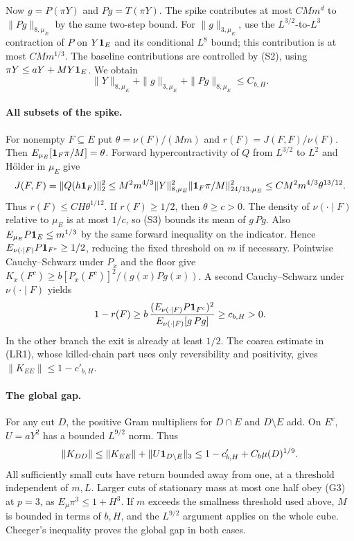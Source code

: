 Now $g=P(\pi Y)$ and $Pg=T(\pi Y)$. The spike contributes at most
$CM m^d$ to $\|Pg\|_{8,\mu_E}$ by the same two-step bound. For
$\|g\|_{3,\mu_E}$, use the $L^{3/2}$-to-$L^3$ contraction of $P$ on
$Y{\bf1}_E$ and its conditional $L^8$ bound; this contribution is
at most $CMm^{1/3}$. The baseline contributions are controlled by
(S2), using $\pi Y\le aY+MY{\bf1}_E$. We obtain
\[
 \|Y\|_{8,\mu_E}+\|g\|_{3,\mu_E}+\|Pg\|_{8,\mu_E}\le C_{b,H}.
 \tag{S3}
\]

\paragraph{All subsets of the spike.}
For nonempty $F\subseteq E$ put $\theta=\nu(F)/(Mm)$ and
$r(F)=J(F,F)/\nu(F)$. Then $E_{\mu_E}[{\bf1}_F\pi/M]=\theta$.
Forward hypercontractivity of $Q$ from $L^{3/2}$ to $L^2$ and
H\"older in $\mu_E$ give
\[
 J(F,F)=\|Q(h{\bf1}_F)\|_2^2
 \le M^2m^{4/3}\|Y\|_{8,\mu_E}^2
                 \|{\bf1}_F\pi/M\|_{24/13,\mu_E}^2
 \le C M^2m^{4/3}\theta^{13/12}.
\]
Thus $r(F)\le CH\theta^{1/12}$. If $r(F)\ge1/2$, then $\theta\ge c>0$.
The density of $\nu(\cdot\mid F)$ relative to $\mu_E$ is at most
$1/c$, so (S3) bounds its mean of $g\,Pg$. Also
$E_{\mu_E}P{\bf1}_E\le m^{1/3}$ by the same forward inequality on the
indicator. Hence $E_{\nu(\cdot\mid F)}P{\bf1}_{F^c}\ge1/2$,
reducing the fixed threshold on $m$ if necessary.
Pointwise Cauchy--Schwarz under $P_x$ and the floor give
$K_x(F^c)\ge b[P_x(F^c)]^2/(g(x)Pg(x))$. A second Cauchy--Schwarz
under $\nu(\cdot\mid F)$ yields
\[
 1-r(F)\ge b\,\frac{(E_{\nu(\cdot\mid F)}P{\bf1}_{F^c})^2}
                         {E_{\nu(\cdot\mid F)}[g\,Pg]}\ge c_{b,H}>0 .
\]
In the other branch the exit is already at least $1/2$. The coarea
estimate in (LR1), whose killed-chain part uses only reversibility and
positivity, gives $\|K_{EE}\|\le1-c'_{b,H}$.

\paragraph{The global gap.}
For any cut $D$, the positive Gram multipliers for $D\cap E$ and
$D\setminus E$ add. On $E^c$, $U=aY^2$ has a bounded $L^{9/2}$
norm. Thus
\[
 \|K_{DD}\|\le\|K_{EE}\|+\|U{\bf1}_{D\setminus E}\|_3
             \le 1-c'_{b,H}+C_b\mu(D)^{1/9}.
\]
All sufficiently small cuts have return bounded away from one, at a
threshold independent of $m,L$. Larger cuts of stationary mass at most
one half obey (G3) at $p=3$, as $E_\mu\pi^3\le1+H^3$. If $m$
exceeds the smallness threshold used above, $M$ is bounded in terms of
$b,H$, and the $L^{9/2}$ argument applies on the whole cube. Cheeger's
inequality proves the global gap in both cases.

